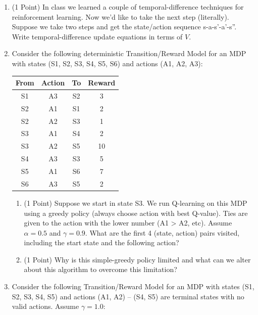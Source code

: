 \documentclass[]{article}
\begin{document}
\begin{enumerate}[label=(\alph*)]
    \item (1 Point) In class we learned a couple of temporal-difference techniques for reinforcement learning. Now we'd like to take the next step (literally). Suppose we take two steps and get the state/action sequence s-a-s'-a'-s''. Write temporal-difference update equations in terms of $V$.
    \item Consider the following deterministic Transition/Reward Model for an MDP with states (S1, S2, S3, S4, S5, S6) and actions (A1, A2, A3):
    \begin{table}[htb]
    \centering
        \begin{tabular}{|c|c|c|c|}
          \hline
            From &	Action &	To &	Reward \\\hline
            S1 &	A3 &	S2 &	3 \\\hline
            S2 &	A1 &	S1 &	2 \\\hline
            S2 &	A2 &	S3 &	1 \\\hline
            S3 &	A1 &	S4 &	2 \\\hline
            S3 &	A2 &	S5 &	10 \\\hline
            S4 &	A3 &	S3 &	5 \\\hline
            S5 &	A1 & 	S6 &	7 \\\hline
            S6 &	A3 &	S5 &	2 \\\hline
        \end{tabular}
    \end{table}
    \begin{enumerate}[label=(\roman*)]
        \item (1 Point) Suppose we start in state S3. We run Q-learning on this MDP using a greedy policy (always choose action with best Q-value). Ties are given to the action with the lower number (A1 > A2, etc). Assume $\alpha=0.5$ and $\gamma=0.9$. What are the first 4 (state, action) pairs visited, including the start state and the following action?
        \item (1 Point) Why is this simple-greedy policy limited and what can we alter about this algorithm to overcome this limitation? 
    \end{enumerate}
    \item Consider the following Transition/Reward Model for an MDP with states (S1, S2, S3, S4, S5) and actions (A1, A2) -- (S4, S5) are terminal states with no valid actions. Assume $\gamma=1.0$:
    \begin{table}[htb]

\end{table}
\end{enumerate}
\end{document}
